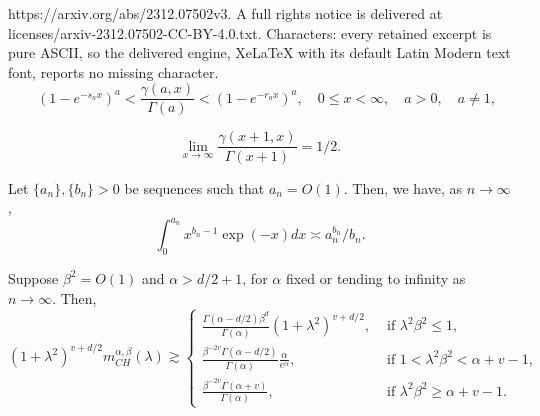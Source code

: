 \documentclass[10pt,a4paper]{amsart}
\begin{document}
https://arxiv.org/abs/2312.07502v3. A full rights notice is delivered at licenses/arxiv-2312.07502-CC-BY-4.0.txt. Characters: every retained excerpt is pure ASCII, so the delivered engine, XeLaTeX with its default Latin Modern text font, reports no missing character.
\begin{equation}  \label{incomplete gamma inequality}
\quad\left(1-e^{-s_a x}\right)^a<\frac{\gamma(a, x)}{\Gamma(a)}<\left(1-e^{-r_a x}\right)^a, \quad 0 \leq x<\infty, \quad a>0, \quad a \neq 1,
\end{equation}

\begin{equation}
\lim_{x\to\infty}\frac{\gamma(x+1, x)}{\Gamma(x+1)} = 1/2. \label{incomplete gamma go to 1}
\end{equation}

\begin{lemma}
Let $\{a_n\}, \{b_n\}>0$ be sequences such that  $a_n=O(1)$. Then, we have, as $n\to\infty$,
\begin{displaymath}
    \int_{0}^{a_n} x^{b_n-1} \exp(-x) dx \asymp a_n^{b_n}/b_n.
\end{displaymath}
\label{incomplete integrate}
\end{lemma}

\begin{lemma} \label{CH spectral density tail behavior}
Suppose $\beta^2=O(1)$ and $\alpha>d/2+1$, for $\alpha$ fixed or tending to infinity as $n \to \infty$. Then,
$$
(1+\lambda^2)^{v+d/2} m^{\alpha,\beta}_{CH}(\lambda) \gtrsim \left\{\begin{array}{lll}
\frac{\Gamma(\alpha-d/2)\beta^{d}}{\Gamma(\alpha)}(1+\lambda^{2})^{v+d/2},  & \text { if } \lambda^2 \beta^{2} \leq 1, \\
\frac{\beta^{-2v}\Gamma(\alpha-d/2)}{\Gamma(\alpha)}\frac{\alpha}{e^\alpha}, & \text { if } 1 < \lambda^2 \beta^{2} < \alpha+v-1,\\
\frac{\beta^{-2v}\Gamma(\alpha+v)}{\Gamma(\alpha)},& \text { if } \lambda^2 \beta^{2} \geq  \alpha+v-1.
\end{array}\right.
$$
\end{lemma}
\end{document}
